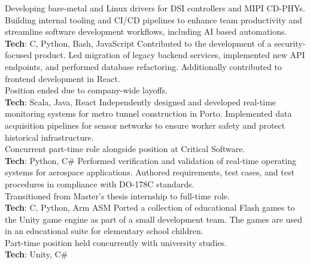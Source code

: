 \documentclass[letterpaper]{twentysecondcv} %
\begin{document}
\begin{twenty}
    {Developing bare-metal and Linux drivers for DSI controllers and MIPI CD-PHYs.
    Building internal tooling and CI/CD pipelines to enhance team productivity and
    streamline software development workflows, including AI based automations.\\
    \textbf{Tech}: C, Python, Bash, JavaScript}
    {Contributed to the development of a security-focused product. Led migration
    of legacy backend services, implemented new API endpoints, and performed
    database refactoring. Additionally contributed to frontend development in React.\\
    Position ended due to company-wide layoffs.\\
    \textbf{Tech}: Scala, Java, React}
    {Independently designed and developed real-time monitoring systems for metro
    tunnel construction in Porto. Implemented data acquisition pipelines for sensor
    networks to ensure worker safety and protect historical infrastructure.\\
    Concurrent part-time role alongside position at Critical Software.\\
    \textbf{Tech}: Python, C\#}
    {Performed verification and validation of real-time operating systems for
    aerospace applications. Authored requirements, test cases, and test procedures
    in compliance with DO-178C standards.\\
    Transitioned from Master's thesis internship to full-time role.\\
    \textbf{Tech}: C, Python, Arm ASM}
    {Ported a collection of educational Flash games to the Unity game engine as
    part of a small development team. The games are used in an educational suite for
    elementary school children.\\
    Part-time position held concurrently with university studies.\\
    \textbf{Tech}: Unity, C\#}
\end{twenty}

\vfill

\end{document}
